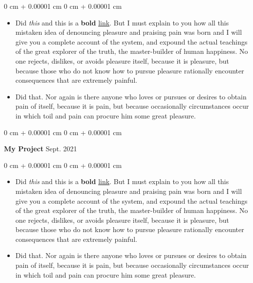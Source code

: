 \documentclass[10pt, letterpaper]{article}
\newenvironment{highlights}{
    \begin{itemize}[
        topsep=0.10 cm,
        parsep=0.10 cm,
        partopsep=0pt,
        itemsep=0pt,
        leftmargin=0 cm + 10pt
    ]
}{
    \end{itemize}
} %
\newenvironment{onecolentry}{
    \begin{adjustwidth}{
        0 cm + 0.00001 cm
    }{
        0 cm + 0.00001 cm
    }
}{
    \end{adjustwidth}
} %
\newenvironment{twocolentry}[2][]{
    \onecolentry
    \def\secondColumn{#2}
    \setcolumnwidth{\fill, 4.5 cm}
    \begin{paracol}{2}
}{
    \switchcolumn \raggedleft \secondColumn
    \end{paracol}
    \endonecolentry
} %
\begin{document}
        \vspace{0.10 cm}
        \begin{onecolentry}
            \begin{highlights}
                \item Did \textit{this} and this is a \textbf{bold} \href{https://example.com}{link}. But I must explain to you how all this mistaken idea of denouncing pleasure and praising pain was born and I will give you a complete account of the system, and expound the actual teachings of the great explorer of the truth, the master-builder of human happiness. No one rejects, dislikes, or avoids pleasure itself, because it is pleasure, but because those who do not know how to pursue pleasure rationally encounter consequences that are extremely painful.
                \item Did that. Nor again is there anyone who loves or pursues or desires to obtain pain of itself, because it is pain, but because occasionally circumstances occur in which toil and pain can procure him some great pleasure.
            \end{highlights}
        \end{onecolentry}


        \vspace{0.2 cm}

        \begin{twocolentry}{
            Sept. 2021
        }
            \textbf{My Project}\end{twocolentry}

        \vspace{0.10 cm}
        \begin{onecolentry}
            \begin{highlights}
                \item Did \textit{this} and this is a \textbf{bold} \href{https://example.com}{link}. But I must explain to you how all this mistaken idea of denouncing pleasure and praising pain was born and I will give you a complete account of the system, and expound the actual teachings of the great explorer of the truth, the master-builder of human happiness. No one rejects, dislikes, or avoids pleasure itself, because it is pleasure, but because those who do not know how to pursue pleasure rationally encounter consequences that are extremely painful.
                \item Did that. Nor again is there anyone who loves or pursues or desires to obtain pain of itself, because it is pain, but because occasionally circumstances occur in which toil and pain can procure him some great pleasure.
            \end{highlights}
        \end{onecolentry}
\end{document}
